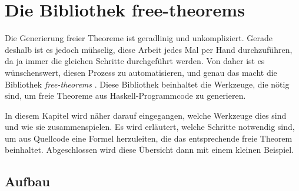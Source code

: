 \section{Die Bibliothek free-theorems}

\label{sec:free-theorems}

Die Generierung freier Theoreme ist geradlinig und unkompliziert. Gerade deshalb ist es jedoch mühselig, diese Arbeit jedes
Mal per Hand durchzuführen, da ja immer die gleichen Schritte durchgeführt werden. Von daher ist es wünschenswert, diesen
Prozess zu automatisieren, und genau das macht die Bibliothek \textit{free-theorems} \cite{freetheorems}. Diese Bibliothek
beinhaltet die Werkzeuge, die nötig sind, um freie Theoreme aus Haskell-Programmcode zu generieren.

In diesem Kapitel wird näher darauf eingegangen, welche Werkzeuge dies sind und wie sie zusammenspielen. Es wird erläutert,
welche Schritte notwendig sind, um aus Quellcode eine Formel herzuleiten, die das entsprechende freie Theorem beinhaltet.
Abgeschlossen wird diese Übersicht dann mit einem kleinen Beispiel.




\subsection{Aufbau}

